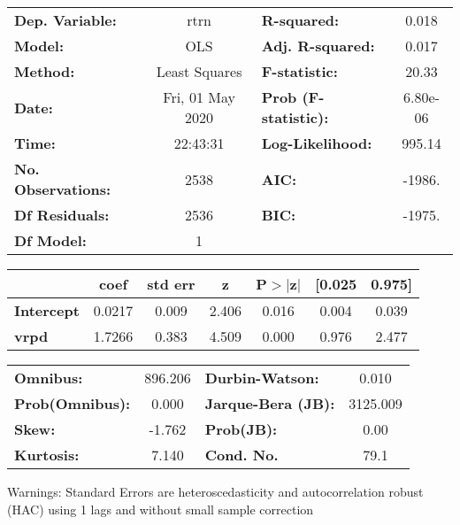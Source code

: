\begin{center}
\begin{tabular}{lclc}
\toprule
\textbf{Dep. Variable:}    &       rtrn       & \textbf{  R-squared:         } &     0.018   \\
\textbf{Model:}            &       OLS        & \textbf{  Adj. R-squared:    } &     0.017   \\
\textbf{Method:}           &  Least Squares   & \textbf{  F-statistic:       } &     20.33   \\
\textbf{Date:}             & Fri, 01 May 2020 & \textbf{  Prob (F-statistic):} &  6.80e-06   \\
\textbf{Time:}             &     22:43:31     & \textbf{  Log-Likelihood:    } &    995.14   \\
\textbf{No. Observations:} &        2538      & \textbf{  AIC:               } &    -1986.   \\
\textbf{Df Residuals:}     &        2536      & \textbf{  BIC:               } &    -1975.   \\
\textbf{Df Model:}         &           1      & \textbf{                     } &             \\
\bottomrule
\end{tabular}
\begin{tabular}{lcccccc}
                   & \textbf{coef} & \textbf{std err} & \textbf{z} & \textbf{P$> |$z$|$} & \textbf{[0.025} & \textbf{0.975]}  \\
\midrule
\textbf{Intercept} &       0.0217  &        0.009     &     2.406  &         0.016        &        0.004    &        0.039     \\
\textbf{vrpd}      &       1.7266  &        0.383     &     4.509  &         0.000        &        0.976    &        2.477     \\
\bottomrule
\end{tabular}
\begin{tabular}{lclc}
\textbf{Omnibus:}       & 896.206 & \textbf{  Durbin-Watson:     } &    0.010  \\
\textbf{Prob(Omnibus):} &   0.000 & \textbf{  Jarque-Bera (JB):  } & 3125.009  \\
\textbf{Skew:}          &  -1.762 & \textbf{  Prob(JB):          } &     0.00  \\
\textbf{Kurtosis:}      &   7.140 & \textbf{  Cond. No.          } &     79.1  \\
\bottomrule
\end{tabular}
\end{center}

Warnings: \newline
 [1] Standard Errors are heteroscedasticity and autocorrelation robust (HAC) using 1 lags and without small sample correction